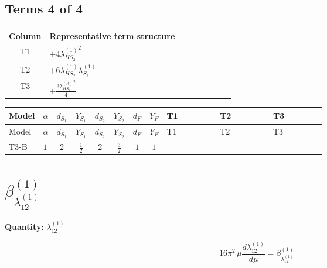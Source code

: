\documentclass[8pt]{article}
\begin{document}
\begin{landscape}
\subsection*{Terms 4 of 4}
\begin{center}
\begin{tabular}{@{}c >{\raggedright\arraybackslash}p{0.82\linewidth}@{}}
\toprule
Column & Representative term structure \\
\midrule
T1 & \(\displaystyle +4 {\lambda_{HS_2}^{(1)}}^2\) \\
\midrule
T2 & \(\displaystyle +6 {\lambda_{HS_2}^{(1)}} {\lambda_{S_2}^{(1)}}\) \\
\midrule
T3 & \(\displaystyle +\frac{3 {\lambda_{HS_2}^{(A)}}^2}{4}\) \\
\midrule
\bottomrule
\end{tabular}
\end{center}
\smallskip
\tiny
\begin{longtable}{@{}llcccccc >{\raggedright\arraybackslash}p{0.21\linewidth} >{\raggedright\arraybackslash}p{0.21\linewidth} >{\raggedright\arraybackslash}p{0.21\linewidth}@{}}
\toprule
Model & $\alpha$ & $d_{S_1}$ & $Y_{S_1}$ & $d_{S_2}$ & $Y_{S_2}$ & $d_F$ & $Y_F$ & T1 & T2 & T3 \\
\midrule
\endfirsthead
\toprule
Model & $\alpha$ & $d_{S_1}$ & $Y_{S_1}$ & $d_{S_2}$ & $Y_{S_2}$ & $d_F$ & $Y_F$ & T1 & T2 & T3 \\
\midrule
\endhead
T3-B & $1$ & $2$ & $\frac{1}{2}$ & $2$ & $\frac{3}{2}$ & $1$ & $1$ & \scriptsize\adjustbox{max width=\linewidth}{$\begin{gathered} +4 {\lambda_{HS_2}^{(1)}}^2\end{gathered}$} & \scriptsize\adjustbox{max width=\linewidth}{$\begin{gathered} +6 {\lambda_{HS_2}^{(1)}} {\lambda_{S_2}^{(1)}}\end{gathered}$} & \scriptsize\adjustbox{max width=\linewidth}{$\begin{gathered} +\frac{3 {\lambda_{HS_2}^{(A)}}^2}{4}\end{gathered}$} \\
\midrule
\bottomrule
\end{longtable}
\clearpage
\section*{$\beta_{\lambda_{12}^{(1)}}^{(1)}$}
\noindent\textbf{Quantity: }$\lambda_{12}^{(1)}$\par\smallskip
\[16\pi^2\,\mu\frac{d \lambda_{12}^{(1)}}{d\mu}=\beta_{\lambda_{12}^{(1)}}^{(1)}\]

\end{landscape}
\end{document}
